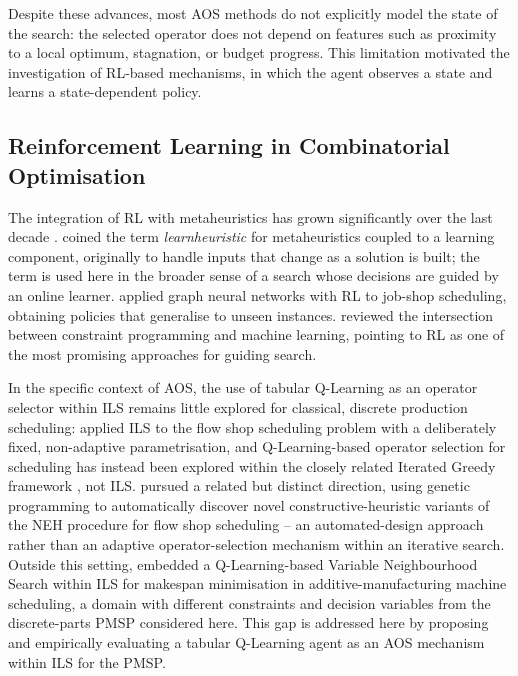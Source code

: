 \documentclass[final,3p,times,11pt,authoryear]{elsarticle}
\begin{document}
Despite these advances, most AOS methods do not explicitly model the
state of the search: the selected operator does not depend on features
such as proximity to a local optimum, stagnation, or budget progress.
This limitation motivated the investigation of RL-based mechanisms, in
which the agent observes a state and learns a state-dependent policy.

\subsection{Reinforcement Learning in Combinatorial Optimisation}

The integration of RL with metaheuristics has grown significantly over
the last decade \citep{BengioBengio2021}.
\citet{CalvetEtal2017} coined the term \emph{learnheuristic} for
metaheuristics coupled to a learning component, originally to handle
inputs that change as a solution is built; the term is used here in
the broader sense of a search whose decisions are guided by an online
learner.
\citet{ParkEtal2021} applied graph neural networks with RL to job-shop
scheduling, obtaining policies that generalise to unseen instances.
\citet{CappartEtal2021} reviewed the intersection between constraint
programming and machine learning, pointing to RL as one of the most
promising approaches for guiding search.

In the specific context of AOS, the use of tabular Q-Learning as an
operator selector within ILS remains little explored for classical,
discrete production scheduling: \citet{JuanEtal2014}
applied ILS to the flow shop scheduling problem with a deliberately
fixed, non-adaptive parametrisation, and Q-Learning-based operator
selection for scheduling has instead been explored within the closely
related Iterated Greedy framework \citep{KarimiMamaghanEtal2023}, not
ILS. \citet{VazquezRodriguezEtal2011} pursued a related but distinct
direction, using genetic programming to automatically discover novel
constructive-heuristic variants of the NEH procedure for flow shop
scheduling -- an automated-design approach rather than an adaptive
operator-selection mechanism within an iterative search. Outside this
setting, \citet{AlicastroEtal2021} embedded a Q-Learning-based Variable
Neighbourhood Search within ILS for makespan minimisation in
additive-manufacturing machine scheduling, a domain with different
constraints and decision variables from the discrete-parts PMSP
considered here.
This gap is addressed here by proposing and empirically evaluating a
tabular Q-Learning agent as an AOS mechanism within ILS for the PMSP.
\end{document}
